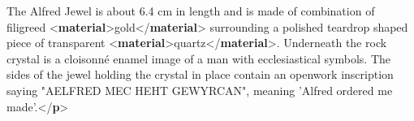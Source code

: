 \begin{shaded}
\hspace*{1em}\hspace*{1em}The Alfred Jewel is about 6.4 cm in length and is made of combination of filigreed {<\textbf{material}>}gold{</\textbf{material}>}\mbox{}\newline 
\hspace*{1em}\hspace*{1em}\hspace*{1em}\hspace*{1em}\hspace*{1em}\hspace*{1em} surrounding a polished teardrop shaped piece of transparent {<\textbf{material}>}quartz{</\textbf{material}>}. Underneath the rock\mbox{}\newline 
\hspace*{1em}\hspace*{1em}\hspace*{1em}\hspace*{1em}\hspace*{1em}\hspace*{1em} crystal is a cloisonné enamel image of a man with ecclesiastical symbols. The sides of the jewel holding the\mbox{}\newline 
\hspace*{1em}\hspace*{1em}\hspace*{1em}\hspace*{1em}\hspace*{1em}\hspace*{1em} crystal in place contain an openwork inscription saying "AELFRED MEC HEHT GEWYRCAN", meaning 'Alfred ordered me\mbox{}\newline 
\hspace*{1em}\hspace*{1em}\hspace*{1em}\hspace*{1em}\hspace*{1em}\hspace*{1em} made'.{</\textbf{p}>}\mbox{}\newline 
\hspace*{1em}\mbox{}\newline 
\hspace*{1em}\mbox{}\newline 

\end{shaded}
